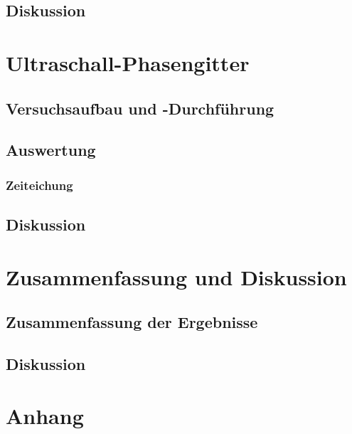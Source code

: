 \documentclass[12pt]{article}
\begin{document}
\newpage
\subsection{Diskussion\label{BOOOOOMMMM!!!!!!!!!}} 

\section{Ultraschall-Phasengitter}

\newpage
\subsection{Versuchsaufbau und -Durchführung}





\newpage
\subsection{Auswertung}
\subsubsection{Zeiteichung}

\newpage
\subsection{Diskussion}

\newpage
\section{Zusammenfassung und Diskussion}

\subsection{Zusammenfassung der Ergebnisse}



\subsection{Diskussion}


\newpage
\section{Anhang} 
\end{document}
